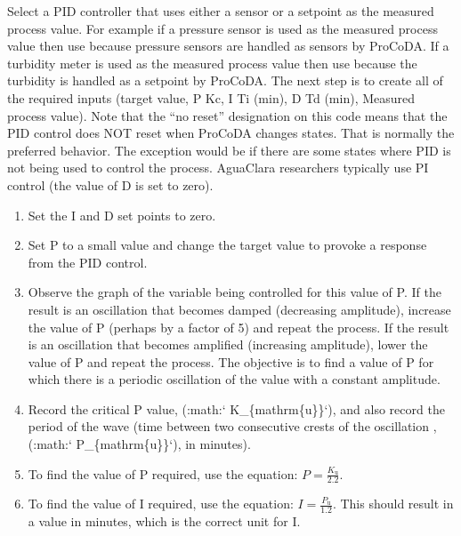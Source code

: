 \documentclass[letterpaper,10pt,english]{sphinxmanual}
\begin{document}
Select a PID controller that uses either a sensor or a setpoint as the measured process value. For example if a pressure sensor is used as the measured process value then use  because pressure sensors are handled as sensors by ProCoDA. If a turbidity meter is used as the measured process value then use  because the turbidity is handled as a setpoint by ProCoDA. The next step is to create all of the required inputs (target value, P Kc, I Ti (min), D Td (min), Measured process value). Note that the “no reset” designation on this code means that the PID control does NOT reset when ProCoDA changes states. That is normally the preferred behavior. The exception would be if there are some states where PID is not being used to control the process. AguaClara researchers typically use PI control (the value of D is set to zero).
\begin{enumerate}
\item {} 
Set the I and D set points to zero.

\item {} 
Set P to a small value and change the target value to provoke a response from the PID control.

\item {} 
Observe the graph of the variable being controlled for this value of P. If the result is an oscillation that becomes damped (decreasing amplitude), increase the value of P (perhaps by a factor of 5) and repeat the process. If the result is an oscillation that becomes amplified (increasing amplitude), lower the value of P and repeat the process. The objective is to find a value of P for which there is a periodic oscillation of the value with a constant amplitude.

\item {} 
Record the critical P value, (:math:{}` K\_\{mathrm\{u\}\}{}`), and also record the period of the wave (time between two consecutive crests of the oscillation , (:math:{}` P\_\{mathrm\{u\}\}{}`), in minutes).

\item {} 
To find the value of P required, use the equation: \(P = \frac{K_{\mathrm{u}}}{2.2}\).

\item {} 
To find the value of I required, use the equation: \(I = \frac{P_{\mathrm{u}}}{1.2}\). This should result in a value in minutes, which is the correct unit for I.

\end{enumerate}
\end{document}
